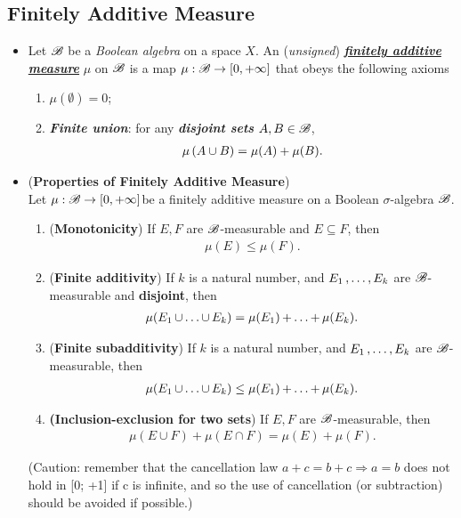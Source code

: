 \documentclass[11pt]{article}
\begin{document}
\subsection{Finitely Additive Measure}
\begin{itemize}
\item
\begin{definition}
Let ${\mathscr B}$ be a \emph{Boolean algebra} on a space $X$. An (\emph{unsigned}) \underline{\emph{\textbf{finitely additive measure}}} $\mu$ on ${\mathscr B}$ is a map $\mu : {\mathscr B} \rightarrow [0,+\infty]$ that obeys the following axioms
\begin{enumerate}
\item $\mu(\emptyset) = 0$;
\item \emph{\textbf{Finite union}}: for any  \emph{\textbf{disjoint sets}} $A, B \in {\mathscr B}$, 
\begin{align*}
\mu\left(A\cup B\right) = \mu(A)+ \mu(B).
\end{align*} 
\end{enumerate}
\end{definition}

\item \begin{proposition} (\textbf{Properties of Finitely Additive Measure}) \citep{tao2011introduction}\\
Let $\mu: {\mathscr B} \rightarrow [0, +\infty]$be a finitely additive measure on a Boolean $\sigma$-algebra ${\mathscr B}$. 
\begin{enumerate}
\item (\textbf{Monotonicity}) If $E, F$ are ${\mathscr B}$-measurable and $E \subseteq F$, then
\begin{align*}
\mu(E) \le \mu(F).
\end{align*}
\item  (\textbf{Finite additivity}) If $k$ is a natural number, and $E_1 \,{,}\ldots{,}\, E_k$ are ${\mathscr B}$-measurable and \textbf{disjoint}, then 
\begin{align*}
\mu(E_1 \,{\cup}\ldots{\cup}\, E_k) = \mu(E_1)  \,{+}\ldots{+}\, \mu(E_k).
\end{align*}
\item  (\textbf{Finite subadditivity}) If $k$ is a natural number, and $E_1 \,{,}\ldots{,}\, E_k$ are ${\mathscr B}$-measurable, then
\begin{align*}
\mu(E_1 \,{\cup}\ldots{\cup}\, E_k) \le \mu(E_1)  \,{+}\ldots{+}\, \mu(E_k).
\end{align*}
\item \textbf{(Inclusion-exclusion for two sets}) If $E, F$ are ${\mathscr B}$-measurable, then
\begin{align*}
\mu(E \cup F ) + \mu(E \cap F ) = \mu(E) + \mu(F).
\end{align*}
\end{enumerate}
(Caution: remember that the cancellation law $a+c = b+c \Rightarrow a = b$ does not hold in [0; +1] if c is infinite, and so the use of cancellation
(or subtraction) should be avoided if possible.)
\end{proposition}


\end{itemize}
\end{document}
